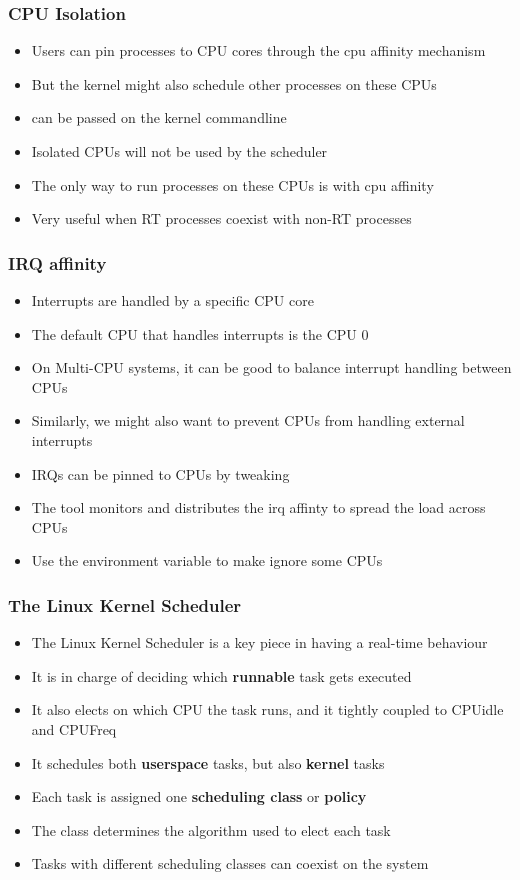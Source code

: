 \begin{frame}
	\frametitle{CPU Isolation}
	\begin{itemize}
		\item Users can pin processes to CPU cores through the cpu affinity mechanism
		\item But the kernel might also schedule other processes on these CPUs
		\item {} can be passed on the kernel commandline
		\item Isolated CPUs will not be used by the scheduler
		\item The only way to run processes on these CPUs is with cpu affinity
		\item Very useful when RT processes coexist with non-RT processes
	\end{itemize}
\end{frame}

\begin{frame}
	\frametitle{IRQ affinity}
	\begin{itemize}
		\item Interrupts are handled by a specific CPU core
		\item The default CPU that handles interrupts is the CPU 0
		\item On Multi-CPU systems, it can be good to balance interrupt handling between CPUs
		\item Similarly, we might also want to prevent CPUs from handling external interrupts
		\item IRQs can be pinned to CPUs by tweaking 
		\item The  tool monitors and distributes the irq affinty to spread the load across CPUs
		\item Use the  environment variable to make  ignore some CPUs
	\end{itemize}
\end{frame}

\begin{frame}
	\frametitle{The Linux Kernel Scheduler}
	\begin{itemize}
		\item The Linux Kernel Scheduler is a key piece in having a real-time behaviour
		\item It is in charge of deciding which \textbf{runnable} task gets executed
		\item It also elects on which CPU the task runs, and it tightly coupled to CPUidle and CPUFreq
		\item It schedules both \textbf{userspace} tasks, but also \textbf{kernel} tasks
		\item Each task is assigned one \textbf{scheduling class} or \textbf{policy}
		\item The class determines the algorithm used to elect each task
		\item Tasks with different scheduling classes can coexist on the system
	\end{itemize}
\end{frame}

